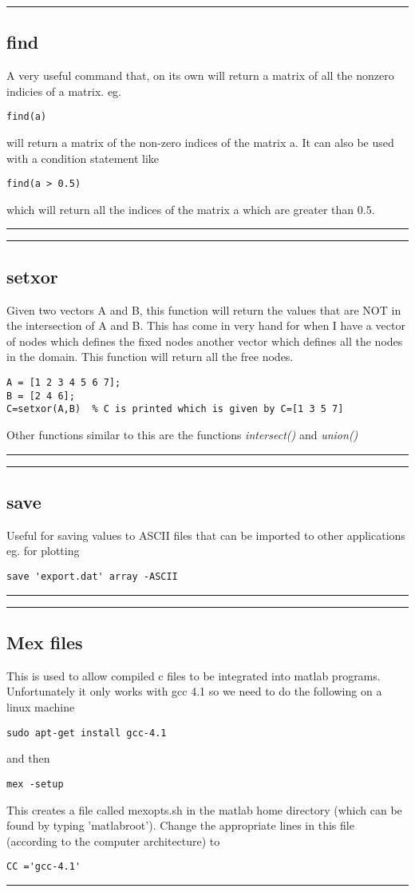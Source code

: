 \documentclass[a4paper, 10pt]{article}
\newcommand{\mytoprule}{\hrule\vspace{4mm}}
\newcommand{\mybotrule}{\vspace{4mm}\hrule}
\begin{document}
\mytoprule
\subsection*{find}
A very useful command that, on its own will return a matrix of all the nonzero indicies of a matrix. eg. 
\begin{Verbatim}[commandchars=\\\{\}]
find(a)
\end{Verbatim}
will return a matrix of the non-zero indices of the matrix a. It can also be used with a condition statement like
\begin{Verbatim}[commandchars=\\\{\}]
find(a > 0.5)
\end{Verbatim}
which will return all the indices of the matrix a which are greater than 0.5.
\mybotrule

\mytoprule
\subsection*{setxor}
Given two vectors A and B, this function will return the values that are NOT in the intersection of A and B. This has come in very hand for when I have a vector of nodes which defines the fixed nodes another vector which defines all the nodes in the domain. This function will return all the free nodes. 
\begin{Verbatim}[commandchars=\\\{\}]
A = [1 2 3 4 5 6 7];
B = [2 4 6];
C=setxor(A,B)  % C is printed which is given by C=[1 3 5 7]
\end{Verbatim}
Other functions similar to this are the functions \emph{intersect()} and \emph{union()}
\mybotrule

\mytoprule
\subsection*{save}
Useful for saving values to ASCII files that can be imported to other applications eg. for plotting
\begin{Verbatim}[commandchars=\\\{\}]
save 'export.dat' array -ASCII
\end{Verbatim}
\mybotrule


\mytoprule
\subsection*{Mex files}
This is used to allow compiled c files to be integrated into matlab programs. Unfortunately it only works with gcc 4.1 so we need to do the following on a linux machine
\begin{Verbatim}
sudo apt-get install gcc-4.1
\end{Verbatim}
and then 
\begin{Verbatim}
mex -setup
\end{Verbatim}
This creates a file called mexopts.sh in the matlab home directory (which can be found by typing 'matlabroot'). Change the appropriate lines in this file (according to the computer architecture) to 
\begin{Verbatim}
CC ='gcc-4.1'
\end{Verbatim}
\mybotrule
\end{document}
